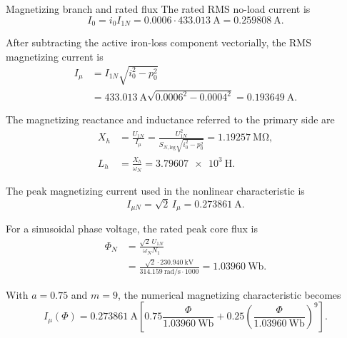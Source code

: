 \begin{formulaBox}{Magnetizing branch and rated flux}
	The rated RMS no-load current is
	\begin{equation}
		I_0=i_0I_{1N}
		=0.0006\cdot\SI{433.013}{\ampere}
		=\SI{0.259808}{\ampere}.
	\end{equation}
	
	After subtracting the active iron-loss component vectorially, the RMS
	magnetizing current is
	\begin{align}
		I_\mu
		&=I_{1N}\sqrt{i_0^2-p_0^2}\\
		&=\SI{433.013}{\ampere}
		\sqrt{0.0006^2-0.0004^2}
		=\boxed{\SI{0.193649}{\ampere}}.
	\end{align}
	
	The magnetizing reactance and inductance referred to the primary side are
	\begin{align}
		X_h
		&=\frac{U_{1N}}{I_\mu}
		=\frac{U_{1N}^2}
		{S_{N,\mathrm{leg}}\sqrt{i_0^2-p_0^2}}
		=\boxed{\SI{1.19257}{\mega\ohm}},\\
		L_h
		&=\frac{X_h}{\omega_N}
		=\boxed{\SI{3.79607e3}{\henry}}.
	\end{align}
	
	The peak magnetizing current used in the nonlinear characteristic is
	\begin{equation}
		I_{\mu N}=\sqrt{2}\,I_\mu
		=\boxed{\SI{0.273861}{\ampere}}.
	\end{equation}
	
	For a sinusoidal phase voltage, the rated peak core flux is
	\begin{align}
		\Phi_N
		&=\frac{\sqrt{2}\,U_{1N}}{\omega_NN_1}\\
		&=\frac{\sqrt{2}\cdot\SI{230.940}{\kilo\volt}}
		{\SI{314.159}{\radian\per\second}\cdot1000}
		=\boxed{\SI{1.03960}{\weber}}.
	\end{align}
	
	With $a=0.75$ and $m=9$, the numerical magnetizing characteristic becomes
	\begin{equation}
		I_\mu(\Phi)
		=\SI{0.273861}{\ampere}
		\left[
		0.75\frac{\Phi}{\SI{1.03960}{\weber}}
		+0.25\left(\frac{\Phi}{\SI{1.03960}{\weber}}\right)^9
		\right].
	\end{equation}
\end{formulaBox}

